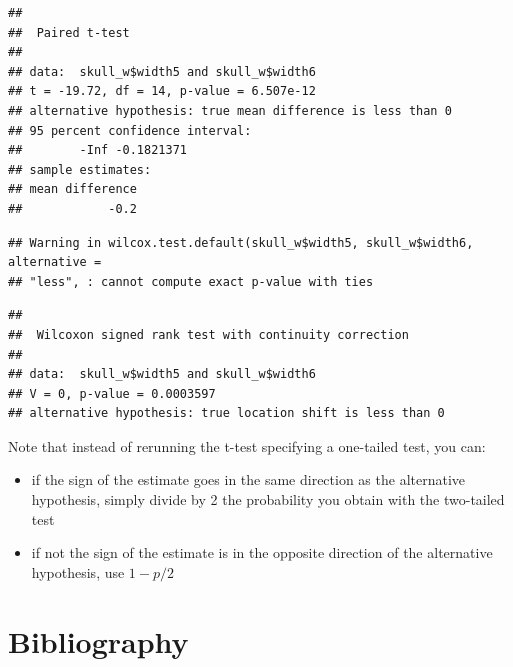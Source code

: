 \documentclass[
  12pt,
]{book}
\makeatletter
\newenvironment{Shaded}{\begin{snugshade}}{\end{snugshade}}
\newcommand{\DataTypeTok}[1]{\textcolor[rgb]{0.13,0.29,0.53}{#1}}
\newcommand{\KeywordTok}[1]{\textcolor[rgb]{0.13,0.29,0.53}{\textbf{#1}}}
\newcommand{\NormalTok}[1]{#1}
\newcommand{\OperatorTok}[1]{\textcolor[rgb]{0.81,0.36,0.00}{\textbf{#1}}}
\newcommand{\OtherTok}[1]{\textcolor[rgb]{0.56,0.35,0.01}{#1}}
\newcommand{\StringTok}[1]{\textcolor[rgb]{0.31,0.60,0.02}{#1}}
\providecommand{\tightlist}{%
  \setlength{\itemsep}{0pt}\setlength{\parskip}{0pt}}
\newenvironment{kframe}{%
\medskip{}
\setlength{\fboxsep}{.8em}
\def\at@end@of@kframe{}%
\ifinner\ifhmode%
 \def\at@end@of@kframe{\end{minipage}}%
 \begin{minipage}{\columnwidth}%
\fi\fi%
\def\FrameCommand##1{\hskip\@totalleftmargin \hskip-\fboxsep
\colorbox{incolor}{##1}\hskip-\fboxsep
    \hskip-\linewidth \hskip-\@totalleftmargin \hskip\columnwidth}%
\MakeFramed {\advance\hsize-\width
  \@totalleftmargin\z@ \linewidth\hsize
  \@setminipage}}%
{\par\unskip\endMakeFramed%
\at@end@of@kframe}
\newenvironment{rmdblock}[1]
 {
 \begin{itemize}
 \renewcommand{\labelitemi}{
   \raisebox{-.7\height}[0pt][0pt]{
     {\setkeys{Gin}{width=3em,keepaspectratio}\texttt{[image: images/\#1]}}
   }
 }
 \begin{kframe}
 \setlength{\fboxsep}{1em}
 \item
 }
 {
 \end{kframe}
 \end{itemize}
 }
\newenvironment{rmdwarning}
  {\begin{rmdblock}{warning}}
  {\end{rmdblock}}
\makeatother
\begin{document}
\begin{verbatim}
## 
##  Paired t-test
## 
## data:  skull_w$width5 and skull_w$width6
## t = -19.72, df = 14, p-value = 6.507e-12
## alternative hypothesis: true mean difference is less than 0
## 95 percent confidence interval:
##        -Inf -0.1821371
## sample estimates:
## mean difference 
##            -0.2
\end{verbatim}

\begin{Shaded}
\end{Shaded}

\begin{verbatim}
## Warning in wilcox.test.default(skull_w$width5, skull_w$width6, alternative =
## "less", : cannot compute exact p-value with ties
\end{verbatim}

\begin{verbatim}
## 
##  Wilcoxon signed rank test with continuity correction
## 
## data:  skull_w$width5 and skull_w$width6
## V = 0, p-value = 0.0003597
## alternative hypothesis: true location shift is less than 0
\end{verbatim}

\begin{rmdwarning}
Note that instead of rerunning the t-test specifying a one-tailed test, you can:

\begin{itemize}
\tightlist
\item
  if the sign of the estimate goes in the same direction as the alternative hypothesis, simply divide by 2 the probability you obtain with the two-tailed test
\item
  if not the sign of the estimate is in the opposite direction of the alternative hypothesis, use \(1 - p/2\)
\end{itemize}
\end{rmdwarning}

\hypertarget{bibliography}{%
\section{Bibliography}\label{bibliography}}
\end{document}
